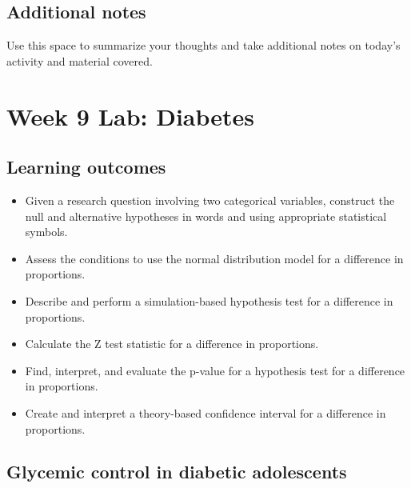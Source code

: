 \documentclass[
]{report}
\begin{document}
\hypertarget{additional-notes-15}{%
\subsection{Additional notes}\label{additional-notes-15}}

Use this space to summarize your thoughts and take additional notes on today's activity and material covered.

\newpage

\hypertarget{week-9-lab-diabetes}{%
\section{Week 9 Lab: Diabetes}\label{week-9-lab-diabetes}}


\hypertarget{learning-outcomes-19}{%
\subsection{Learning outcomes}\label{learning-outcomes-19}}

\begin{itemize}
\item
  Given a research question involving two categorical variables, construct the null and alternative hypotheses
  in words and using appropriate statistical symbols.
\item
  Assess the conditions to use the normal distribution model for a difference in proportions.
\item
  Describe and perform a simulation-based hypothesis test for a difference in proportions.
\item
  Calculate the Z test statistic for a difference in proportions.
\item
  Find, interpret, and evaluate the p-value for a hypothesis test for a difference in proportions.
\item
  Create and interpret a theory-based confidence interval for a difference in proportions.
\end{itemize}

\hypertarget{glycemic-control-in-diabetic-adolescents}{%
\subsection{Glycemic control in diabetic adolescents}\label{glycemic-control-in-diabetic-adolescents}}
\end{document}
